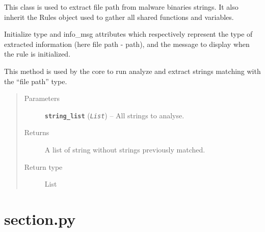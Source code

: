 \documentclass[letterpaper,10pt,oneside]{sphinxmanual}
\begin{document}
\begin{fulllineitems}
\label{index:lib.allRules.path.Path}
This class is used to extract file path from malware
binaries strings. It also inherit the Rules object used to gather
all shared functions and variables.

\begin{fulllineitems}
\label{index:lib.allRules.path.Path.__init__}
Initialize type and info\_msg attributes which respectively represent
the type of extracted information (here file path - path),
and the message to display when the rule is initialized.

\end{fulllineitems}


\begin{fulllineitems}
\label{index:lib.allRules.path.Path.run_analysis}
This method is used by the core to run analyze and extract strings
matching with the ``file path'' type.
\begin{quote}\begin{description}
\item[{Parameters}] \leavevmode
\textbf{\texttt{string\_list}} (\emph{\texttt{List}}) -- All strings to analyse.

\item[{Returns}] \leavevmode
A list of string without strings previously matched.

\item[{Return type}] \leavevmode
List

\end{description}\end{quote}

\end{fulllineitems}


\end{fulllineitems}



\section{section.py}
\label{index:section-py}\label{index:module-lib.allRules.section}
\end{document}
